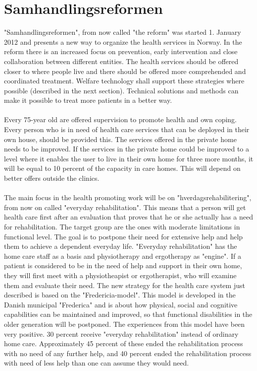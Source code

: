 \section{Samhandlingsreformen}
"Samhandlingsreformen", from now called "the reform" was started 1. January 2012 and presents a new way to organize the health services in Norway. In the reform there is an increased focus on prevention, early intervention and close collaboration between different entities. The health services should be offered closer to where people live and there should be offered more comprehended and coordinated treatment. Welfare technology shall support these strategies where possible (described in the next section). Technical solutions and methods can make it possible to treat more patients in a better way. \\ \\
Every 75-year old are offered supervision to promote health and own coping. Every person who is in need of health care services that can be deployed in their own house, should be provided this. The services offered in the private home needs to be improved. If the services in the private home could be improved to a level where it enables the user to live in their own home for three more months, it will be equal to 10 percent of the capacity in care homes. This will depend on better offers outside the clinics.\\ \\ The main focus in the health promoting work will be on "hverdagsrehabilitering", from now on called  "everyday rehabilitation". This means that a person will get health care first after an evaluation that proves that he or she actually has a need for rehabilitation. The target group are the ones with moderate limitations in functional level. The goal is to postpone their need for extensive help and help them to achieve a dependent everyday life.  "Everyday rehabilitation" has the home care staff as a basis and physiotherapy and ergotherapy as "engine". If a patient is considered to be in the need of help and support in their own home, they will first meet with a physiotheapist or ergotherapist, who will examine them and evaluate their need. The new strategy for the health care system just described is based on the "Fredericia-model". This model is developed in the Danish municipal "Frederica" and is about how physical, social and cognitive capabilities can be maintained and improved, so that functional disabilities in the older generation will be postponed. The experiences from this model have been very positive. 30 percent receive "everyday rehabilitation" instead of ordinary home care. Approximately 45 percent of these ended the rehabilitation process with no need of any further help, and 40 percent ended the rehabilitation process with need of less help than one can assume they would need.\cite{budsjett}\cite{regjering}
